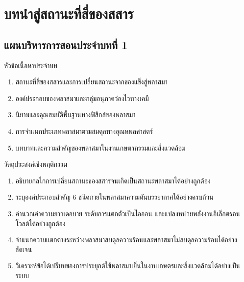 \chapter{บทนำสู่สถานะที่สี่ของสสาร}
\label{chap:ch01}


\section*{แผนบริหารการสอนประจำบทที่ 1}

\begin{planbox}{หัวข้อเนื้อหาประจำบท}
\begin{enumerate}
    \item สถานะที่สี่ของสสารและการเปลี่ยนสถานะจากของแข็งสู่พลาสมา
    \item องค์ประกอบของพลาสมาและกลุ่มอนุภาคว่องไวทางเคมี
    \item นิยามและคุณสมบัติพื้นฐานทางฟิสิกส์ของพลาสมา
    \item การจำแนกประเภทพลาสมาตามสมดุลทางอุณหพลศาสตร์
    \item บทบาทและความสำคัญของพลาสมาในงานเกษตรกรรมและสิ่งแวดล้อม
\end{enumerate}
\end{planbox}

\begin{planbox}{วัตถุประสงค์เชิงพฤติกรรม}
\begin{enumerate}
    \item อธิบายกลไกการเปลี่ยนสถานะของสสารจนเกิดเป็นสถานะพลาสมาได้อย่างถูกต้อง
    \item ระบุองค์ประกอบสำคัญ 6 ชนิดภายในพลาสมาความดันบรรยากาศได้อย่างครบถ้วน
    \item คำนวณค่าความยาวเดอบาย ระดับการแตกตัวเป็นไอออน และแปลงหน่วยพลังงานอิเล็กตรอนโวลต์ได้อย่างถูกต้อง
    \item จำแนกความแตกต่างระหว่างพลาสมาสมดุลความร้อนและพลาสมาไม่สมดุลความร้อนได้อย่างชัดเจน
    \item วิเคราะห์ข้อได้เปรียบของการประยุกต์ใช้พลาสมาเย็นในงานเกษตรและสิ่งแวดล้อมได้อย่างเป็นระบบ
\end{enumerate}
\end{planbox}

\newpage

